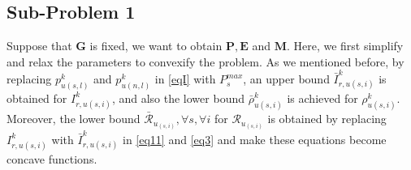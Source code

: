 \documentclass[lettersize,journal]{IEEEtran}
\begin{document}
\subsection{Sub-Problem 1}\label{sub1}
Suppose that $\boldsymbol{G}$ is fixed, we want to obtain $\boldsymbol{P}, \boldsymbol{E}$ and $\boldsymbol{M}$.
Here, we first simplify and relax the parameters to convexify the problem.
As we mentioned before, by replacing $p_{u(s,l)}^{k}$ and $p_{u(n,l)}^{k}$ in \eqref{eqI} with $P^{max}_s$, an upper bound $\bar{I}_{r,u(s,i)}^{k}$ is obtained for $I_{r,u(s,i)}^{k}$, and also the lower bound $\bar{\rho}_{u(s,i)}^{k}$ is achieved
for $\rho_{u(s,i)}^{k}$.
Moreover, the lower bound $\bar{\mathcal{R}}_{u_{(s,i)}}, \forall s , \forall i$ for  ${\mathcal{R}}_{u_{(s,i)}}$ is obtained by replacing $I_{r,u(s,i)}^{k}$ with $\bar{I}_{r,u(s,i)}^{k}$ in \eqref{eq11} and \eqref{eq3} and make these equations become concave functions.
\end{document}
